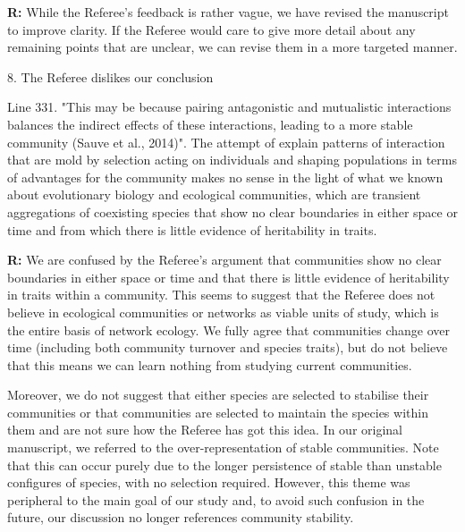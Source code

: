 \documentclass[12pt]{letter}
\newenvironment{refquote}{\bigskip \begin{it}}{\end{it}\smallskip}
\begin{document}
    \textbf{R:} While the Referee's feedback is rather vague, we have revised the manuscript to improve clarity. If the Referee would care to give more detail about any remaining points that are unclear, we can revise them in a more targeted manner.


  8. The Referee dislikes our conclusion

    \begin{refquote}

      Line 331. "This may be because pairing antagonistic and mutualistic interactions balances the indirect effects of these interactions, leading to a more stable community (Sauve et al., 2014)". The attempt of explain patterns of interaction that are mold by selection acting on individuals and shaping populations in terms of advantages for the community makes no sense in the light of what we known about evolutionary biology and ecological communities, which are transient aggregations of coexisting species that show no clear boundaries in either space or time and from which there is little evidence of heritability in traits.

      \end{refquote}

      \textbf{R:} We are confused by the Referee's argument that communities show no clear boundaries in either space or time and that there is little evidence of heritability in traits within a community. This seems to suggest that the Referee does not believe in ecological communities or networks as viable units of study, which is the entire basis of network ecology. We fully agree that communities change over time (including both community turnover and species traits), but do not believe that this means we can learn nothing from studying current communities.


      Moreover, we do not suggest that either species are selected to stabilise their communities or that communities are selected to maintain the species within them and are not sure how the Referee has got this idea. In our original manuscript, we referred to the over-representation of stable communities. Note that this can occur purely due to the longer persistence of stable than unstable configures of species, with no selection required. However, this theme was peripheral to the main goal of our study and, to avoid such confusion in the future, our discussion no longer references community stability.


\newpage

\renewcommand*{\bibfont}{\raggedright}

\end{document}

